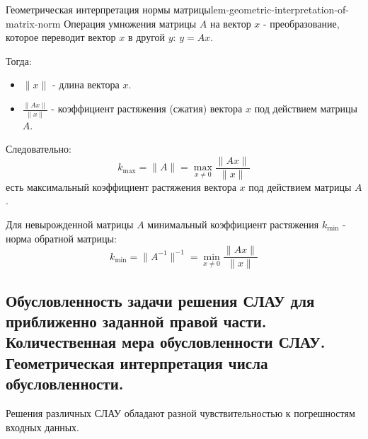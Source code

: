 \documentclass[14pt]{extarticle}
\begin{document}
    \clearpage
    \begin{lemma}{Геометрическая интерпретация нормы матрицы}{lem-geometric-interpretation-of-matrix-norm}
        Операция умножения матрицы $A$ на вектор $x$ - преобразование, которое переводит вектор $x$ в другой $y$: $y = Ax$.

        \vspace{\baselineskip}
        
        Тогда:
        \begin{itemize}
            \item $\|x\|$ - длина вектора $x$.
            \item $\frac{\|Ax\|}{\|x\|}$ - коэффициент растяжения (сжатия) вектора $x$ под действием матрицы $A$.
        \end{itemize}
        
        \vspace{\baselineskip}
        
        Следовательно:
        $$k_{\max} = \|A\| = \max_{x \neq 0} \frac{\|Ax\|}{\|x\|}$$
        есть максимальный коэффициент растяжения вектора $x$ под действием матрицы $A$.
    
        \vspace{\baselineskip}

        Для невырожденной матрицы $A$ минимальный коэффициент растяжения $k_{\min}$ - норма обратной матрицы:
        $$k_{\min} = \|A^{-1}\|^{-1} = \min_{x \neq 0} \frac{\|Ax\|}{\|x\|}$$
    \end{lemma}

\clearpage
\subsection{Обусловленность задачи решения СЛАУ для приближенно заданной правой части. Количественная мера обусловленности СЛАУ. Геометрическая интерпретация числа обусловленности.}

    Решения различных СЛАУ обладают разной чувствительностью к погрешностям входных данных.
\end{document}
